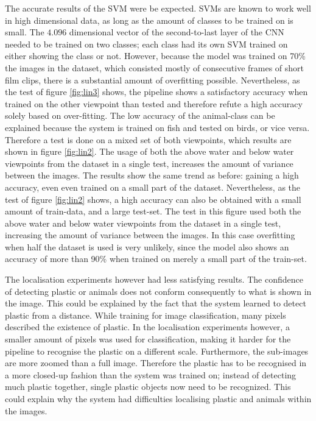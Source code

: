 The accurate results of the SVM were be expected.
SVMs are known to work well in high dimensional data, as long as the amount of classes to be trained on is small.
The $4.096$ dimensional vector of the second-to-last layer of the CNN needed to be trained on two classes; each class had its own SVM trained on either showing the class or not.
However, because the model was trained on 70\% the images in the dataset, which consisted mostly of consecutive frames of short film clips, there is a substantial amount of overfitting possible.
\ifx\showmixi\undefined
Nevertheless, as the test of figure \ref{fig:lin3} shows, the pipeline shows a satisfactory accuracy when trained on the other viewpoint than tested and therefore refute a high accuracy solely based on over-fitting.
The low accuracy of the animal-class can be explained because the system is trained on fish and tested on birds, or vice versa.
Therefore a test is done on a mixed set of both viewpoints, which results are shown in figure \ref{fig:lin2}.
The usage of both the above water and below water viewpoints from the dataset in a single test, increases the amount of variance between the images.
The results show the same trend as before: gaining a high accuracy, even even trained on a small part of the dataset.
\else
Nevertheless, as the test of figure \ref{fig:lin2} shows, a high accuracy can also be obtained with a small amount of train-data, and a large test-set.
The test in this figure used both the above water and below water viewpoints from the dataset in a single test, increasing the amount of variance between the images.
\fi
In this case overfitting when half the dataset is used is very unlikely, since the model also shows an accuracy of more than 90\% when trained on merely a small part of the train-set.

The localisation experiments however had less satisfying results.
The confidence of detecting plastic or animals does not conform consequently to what is shown in the image.
This could be explained by the fact that the system learned to detect plastic from a distance.
While training for image classification, many pixels described the existence of plastic. In the localisation experiments however, a smaller amount of pixels was used for classification, making it harder for the pipeline to recognise the plastic on a different scale.
Furthermore, the sub-images are more zoomed than a full image.
Therefore the plastic has to be recognised in a more closed-up fashion than the system was trained on; instead of detecting much plastic together, single plastic objects now need to be recognized.
This could explain why the system had difficulties localising plastic and animals within the images.

